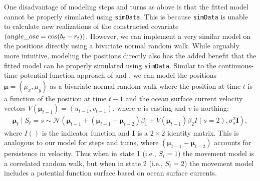 \documentclass[12pt]{article}\usepackage[]{graphicx}\usepackage[]{color}
\begin{document}
One disadvantage of modeling steps and turns as above is that the fitted model cannot be properly simulated using \verb|simData|. This is because \verb|simData| is unable to calculate new realizations of the constructed covariate $\left({\text angle\_osc}=\cos(b_t-r_t)\right)$. However, we can implement a very similar model on the positions directly using a bivariate normal random walk.  While arguably more intuitive, modeling the positions directly also has the added benefit that the fitted model can be properly simulated using \verb|simData|. Similar to the continuous-time potential function approach of \cite{BrillingerEtAl2012} and \cite{HootenEtAl2019}, we can model the positions ${\boldsymbol \mu}=(\mu_x, \mu_y)$ as a bivariate normal random walk where the position at time $t$ is a function of the position at time $t-1$ and the ocean surface current velocity vectors $V({\boldsymbol \mu}_{t-1})=(u_{t-1},v_{t-1})$, where $u$ is easting and $v$ is northing:
\begin{eqnarray}
\label{eq:potFun}
{\boldsymbol \mu}_t \mid S_t = s \sim {\mathcal N} \left({\boldsymbol \mu}_{t-1}+({\boldsymbol \mu}_{t-1}-{\boldsymbol \mu}_{t-2})\beta_1 + V({\boldsymbol \mu}_{t-1})\beta_2 I(s=2),\sigma_s^2 {\mathbf I} \right),
\end{eqnarray}
where $I()$ is the indicator function and $\mathbf I$ is a $2 \times 2$ identity matrix. %
This is analogous to our model for steps and turns, where $({\boldsymbol \mu}_{t-1}-{\boldsymbol \mu}_{t-2})$ accounts for persistence in velocity. Thus when in state 1 (i.e., $S_t=1$) the movement model is a correlated random walk, but when in state 2 (i.e., $S_t=2$) the movement model includes a potential function surface based on ocean surface currents.
\end{document}
